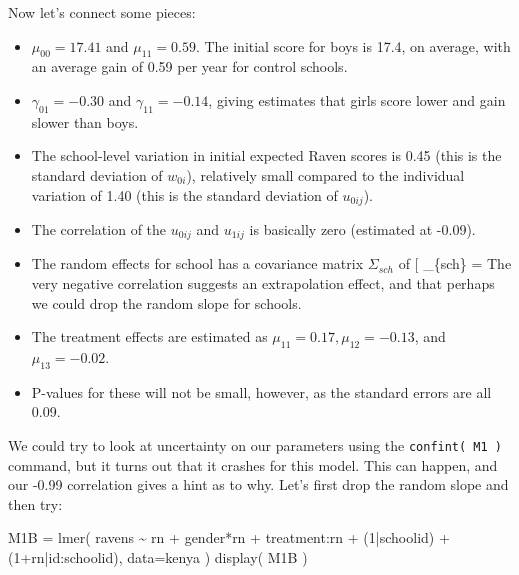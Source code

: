 \documentclass[
  letterpaper,
  DIV=11,
  numbers=noendperiod]{scrreprt}
\newenvironment{Shaded}{\begin{snugshade}}{\end{snugshade}}
\newcommand{\AttributeTok}[1]{\textcolor[rgb]{0.49,0.56,0.16}{#1}}
\newcommand{\DecValTok}[1]{\textcolor[rgb]{0.25,0.63,0.44}{#1}}
\newcommand{\FunctionTok}[1]{\textcolor[rgb]{0.02,0.16,0.49}{#1}}
\newcommand{\NormalTok}[1]{\textcolor[rgb]{0.00,0.44,0.13}{#1}}
\newcommand{\OtherTok}[1]{\textcolor[rgb]{0.00,0.44,0.13}{#1}}
\newcommand{\SpecialCharTok}[1]{\textcolor[rgb]{0.25,0.44,0.63}{#1}}
\providecommand{\tightlist}{%
  \setlength{\itemsep}{0pt}\setlength{\parskip}{0pt}}\usepackage{longtable,booktabs,array}
\begin{document}
Now let's connect some pieces:

\begin{itemize}
\tightlist
\item
  \(\mu_{00} = 17.41\) and \(\mu_{11} = 0.59\). The initial score for
  boys is 17.4, on average, with an average gain of 0.59 per year for
  control schools.
\item
  \(\gamma_{01} = -0.30\) and \(\gamma_{11} = -0.14\), giving estimates
  that girls score lower and gain slower than boys.
\item
  The school-level variation in initial expected Raven scores is 0.45
  (this is the standard deviation of \(w_{0i}\)), relatively small
  compared to the individual variation of 1.40 (this is the standard
  deviation of \(u_{0ij}\)).
\item
  The correlation of the \(u_{0ij}\) and \(u_{1ij}\) is basically zero
  (estimated at -0.09).
\item
  The random effects for school has a covariance matrix \(\Sigma_{sch}\)
  of {[} \widehat{\Sigma}\_\{sch\} = \left[ 
  \begin{array}{cc}
  0.45^2 & 0.45 \times 0.09 \times -0.99 \\
  . & 0.09^2 
  \end{array} 
  \right] {]} The very negative correlation suggests an extrapolation
  effect, and that perhaps we could drop the random slope for schools.
\item
  The treatment effects are estimated as
  \(\mu_{11}=0.17, \mu_{12}=-0.13\), and \(\mu_{13}=-0.02\).\\
\item
  P-values for these will not be small, however, as the standard errors
  are all 0.09.
\end{itemize}

We could try to look at uncertainty on our parameters using the
\texttt{confint(\ M1\ )} command, but it turns out that it crashes for
this model. This can happen, and our -0.99 correlation gives a hint as
to why. Let's first drop the random slope and then try:

\begin{Shaded}
\begin{Highlighting}[]
\NormalTok{M1B }\OtherTok{=} \FunctionTok{lmer}\NormalTok{( ravens }\SpecialCharTok{\textasciitilde{}}\NormalTok{ rn }\SpecialCharTok{+}\NormalTok{ gender}\SpecialCharTok{*}\NormalTok{rn }\SpecialCharTok{+}\NormalTok{ treatment}\SpecialCharTok{:}\NormalTok{rn }\SpecialCharTok{+}\NormalTok{ (}\DecValTok{1}\SpecialCharTok{|}\NormalTok{schoolid) }\SpecialCharTok{+}\NormalTok{ (}\DecValTok{1}\SpecialCharTok{+}\NormalTok{rn}\SpecialCharTok{|}\NormalTok{id}\SpecialCharTok{:}\NormalTok{schoolid), }
           \AttributeTok{data=}\NormalTok{kenya )}
\FunctionTok{display}\NormalTok{( M1B )}
\end{Highlighting}
\end{Shaded}
\end{document}
